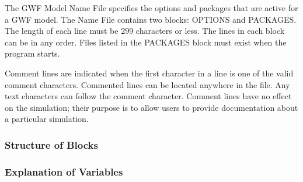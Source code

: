 The GWF Model Name File specifies the options and packages that are active for a GWF model.  The Name File contains two blocks: OPTIONS and PACKAGES. The length of each line must be 299 characters or less. The lines in each block can be in any order.  Files listed in the PACKAGES block must exist when the program starts. 

Comment lines are indicated when the first character in a line is one of the valid comment characters.  Commented lines can be located anywhere in the file. Any text characters can follow the comment character. Comment lines have no effect on the simulation; their purpose is to allow users to provide documentation about a particular simulation. 

\vspace{5mm}
\subsubsection{Structure of Blocks}



\vspace{5mm}
\subsubsection{Explanation of Variables}
\begin{description}

\end{description}


